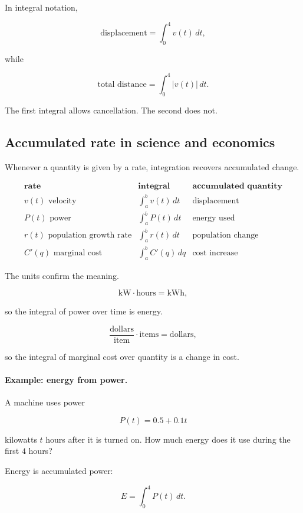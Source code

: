 In integral notation,

\[
\text{displacement}=\int_0^4 v(t)\,dt,
\]

while

\[
\text{total distance}=\int_0^4 |v(t)|\,dt.
\]

The first integral allows cancellation.  The second does not.

\subsection{Accumulated rate in science and economics}
\label{subsec:accumulated-rate-science-economics}

Whenever a quantity is given by a rate, integration recovers accumulated change.

\[
\begin{array}{c|c|c}
\textbf{rate} & \textbf{integral} & \textbf{accumulated quantity} \\ \hline
v(t)\text{ velocity} & \displaystyle\int_a^b v(t)\,dt & \text{displacement} \\[8pt]
P(t)\text{ power} & \displaystyle\int_a^b P(t)\,dt & \text{energy used} \\[8pt]
r(t)\text{ population growth rate} & \displaystyle\int_a^b r(t)\,dt & \text{population change} \\[8pt]
C'(q)\text{ marginal cost} & \displaystyle\int_a^b C'(q)\,dq & \text{cost increase}
\end{array}
\]

The units confirm the meaning.

\[
\text{kW}\cdot\text{hours}=\text{kWh},
\]

so the integral of power over time is energy.

\[
\frac{\text{dollars}}{\text{item}}\cdot\text{items}=\text{dollars},
\]

so the integral of marginal cost over quantity is a change in cost.

\paragraph{Example: energy from power.}
A machine uses power

\[
P(t)=0.5+0.1t
\]

kilowatts \(t\) hours after it is turned on.  How much energy does it use during the first
\(4\) hours?

Energy is accumulated power:

\[
E=\int_0^4 P(t)\,dt.
\]

